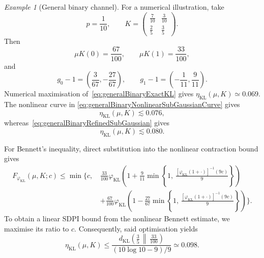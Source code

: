 \documentclass[11pt]{article}
\theoremstyle{plain}
\theoremstyle{remark}
\newtheorem{example}{Example}
\begin{document}
\begin{example}[General binary channel]
For a numerical illustration, take
\begin{equation}
p=\frac{1}{10},
\qquad
K=
\begin{pmatrix}
\frac{7}{10} & \frac{3}{10}\\[1mm]
\frac{2}{5} & \frac{3}{5}
\end{pmatrix}.
\label{eq:generalBinaryNumericalChannel}
\end{equation}
Then
\begin{equation}
\mu K(0)=\frac{67}{100},
\qquad
\mu K(1)=\frac{33}{100},
\end{equation}
and
\begin{equation}
g_0-1=
\left(
\frac{3}{67},-\frac{27}{67}
\right),
\qquad
g_1-1=
\left(
-\frac{1}{11},\frac{9}{11}
\right).
\label{eq:generalBinaryNumericalReverseDensities}
\end{equation}
Numerical maximisation of~\eqref{eq:generalBinaryExactKL} gives
 $\eta_{\mathrm{KL}}(\mu,K)
\simeq 0.069$.
The nonlinear curve in
\eqref{eq:generalBinaryNonlinearSubGaussianCurve} gives
\begin{equation}
\eta_{\mathrm{KL}}(\mu,K)
\lesssim  
0.076,
\end{equation}
whereas~\eqref{eq:generalBinaryRefinedSubGaussian} gives
\begin{equation}
\eta_{\mathrm{KL}}(\mu,K)
\lesssim
0.080.
\end{equation}

For Bennett's inequality, direct substitution into the nonlinear
contraction bound gives
\begin{align}
F_{\varphi_{\mathrm{KL}}}(\mu,K;c)
\leq
\min\Bigg\{c,\,
&
\frac{33}{100}
\varphi_{\mathrm{KL}}\!\left(
1+
\frac{9}{11}
\min\left\{
1,\,
\frac{
[\varphi_{\mathrm{KL}}(1+\cdot)]^{-1}(9c)
}{9}
\right\}
\right)
\nonumber\\
&+
\frac{67}{100}
\varphi_{\mathrm{KL}}\!\left(
1-
\frac{27}{67}
\min\left\{
1,\,
\frac{
[\varphi_{\mathrm{KL}}(1+\cdot)]^{-1}(9c)
}{9}
\right\}
\right)
\Bigg\}.
\label{eq:generalBinaryBennettCurve}
\end{align}
To obtain a linear SDPI bound from the nonlinear Bennett estimate, we maximise its ratio to $c$. Consequently, said optimisation yields  
\begin{equation}
\eta_{\mathrm{KL}}(\mu,K)
\leq
\frac{
d_{\mathrm{KL}}\!\left(
\frac35\,\middle\|\,\frac{33}{100}
\right)
}{
(10\log 10-9)/9
}
\simeq
0.098.
\label{eq:generalBinaryBennettValue}
\end{equation}


\end{example}
\end{document}
